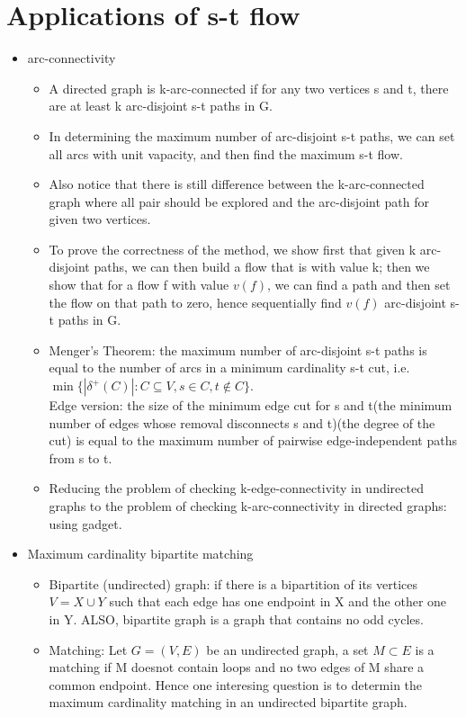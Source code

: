 \documentclass{article}
\begin{document}
\section{Applications of s-t flow}
\begin{itemize}
\item arc-connectivity
\begin{itemize}
\item A directed graph is k-arc-connected if for any two vertices s and t, there are at least k arc-disjoint s-t paths in G.
\item In determining the maximum number of arc-disjoint s-t paths, we can set all arcs with unit vapacity, and then find the maximum s-t flow.
\item Also notice that there is still difference between the k-arc-connected graph where all pair should be explored and the arc-disjoint path for given two vertices.
\item To prove the correctness of the method, we show first that given k arc-disjoint paths, we can then build a flow that is with value k; then we show that for a flow f with value $v(f)$, we can find a path and then set the flow on that path to zero, hence sequentially find $v(f)$ arc-disjoint s-t paths in G.
\item Menger's Theorem: the maximum number of arc-disjoint s-t paths is equal to the number of arcs in a minimum cardinality s-t cut, i.e. $\min\{|\delta^+(C)|:C\subseteq V, s\in C, t\notin C\}$.\\
Edge version: the size of the minimum edge cut for s and t(the minimum number of edges whose removal disconnects s and t)(the degree of the cut) is equal to the maximum number of pairwise edge-independent paths from s to t.
\item Reducing the problem of checking k-edge-connectivity in undirected graphs to the problem of checking k-arc-connectivity in directed graphs: using gadget.
\end{itemize}
\item Maximum cardinality bipartite matching
\begin{itemize}
\item Bipartite (undirected) graph: if there is a bipartition of its vertices $V=X\cup Y$ such that each edge has one endpoint in X and the other one in Y. ALSO, bipartite graph is a graph that contains no odd cycles.
\item Matching: Let $G=(V,E)$ be an undirected graph, a set $M\subset E$ is a matching if M doesnot contain loops and no two edges of M share a common endpoint. Hence one interesing question is to determin the maximum cardinality matching in an undirected bipartite graph.

\end{itemize}
\end{itemize}
\end{document}
